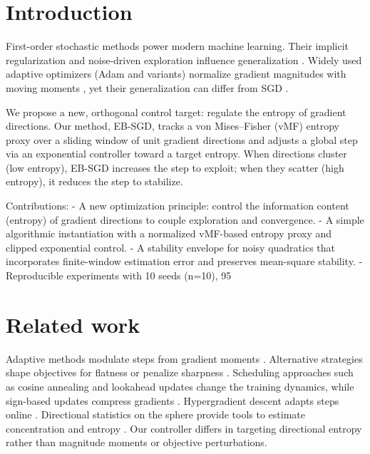\section{Introduction}
First-order stochastic methods power modern machine learning. Their implicit regularization and noise-driven exploration influence generalization \cite{Smith2018BayesianSGDICLR,Keskar2017LargeBatchICLR,Wilson2017MarginalValueNeurIPS}. Widely used adaptive optimizers (Adam and variants) normalize gradient magnitudes with moving moments \cite{Kingma2015AdamICLR,Reddi2018AdamConvergenceICLR,Luo2019AdaBoundICLR,Loshchilov2019AdamWICLR,Liu2020RAdamICLR,Zhuang2020AdaBeliefNeurIPS}, yet their generalization can differ from SGD \cite{Wilson2017MarginalValueNeurIPS,Foret2021SAMICLR}.

We propose a new, orthogonal control target: regulate the entropy of gradient directions. Our method, EB-SGD, tracks a von Mises--Fisher (vMF) entropy proxy over a sliding window of unit gradient directions and adjusts a global step via an exponential controller toward a target entropy. When directions cluster (low entropy), EB-SGD increases the step to exploit; when they scatter (high entropy), it reduces the step to stabilize.

Contributions:
- A new optimization principle: control the information content (entropy) of gradient directions to couple exploration and convergence.
- A simple algorithmic instantiation with a normalized vMF-based entropy proxy and clipped exponential control.
- A stability envelope for noisy quadratics that incorporates finite-window estimation error and preserves mean-square stability.
- Reproducible experiments with 10 seeds (n=10), 95%

\section{Related work}
Adaptive methods modulate steps from gradient moments \cite{Kingma2015AdamICLR,Reddi2018AdamConvergenceICLR,Luo2019AdaBoundICLR,Liu2020RAdamICLR,Zhuang2020AdaBeliefNeurIPS,Loshchilov2019AdamWICLR}. Alternative strategies shape objectives for flatness \cite{Chaudhari2019EntropySGDJSTAT} or penalize sharpness \cite{Foret2021SAMICLR}. Scheduling approaches such as cosine annealing \cite{Loshchilov2017SGDRICLR} and lookahead updates \cite{Zhang2019LookaheadNeurIPS} change the training dynamics, while sign-based updates compress gradients \cite{Bernstein2018signSGDICML}. Hypergradient descent adapts steps online \cite{Baydin2018HypergradientICLR}. Directional statistics on the sphere provide tools to estimate concentration and entropy \cite{MardiaJupp2000Directional,Banerjee2005vMFJMLR}. Our controller differs in targeting directional entropy rather than magnitude moments or objective perturbations.

